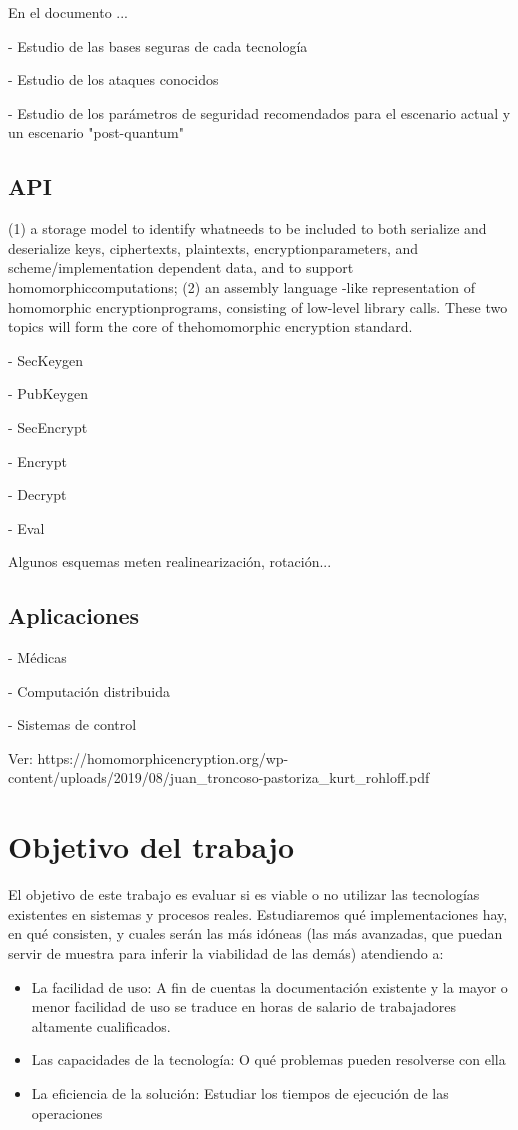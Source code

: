 En el documento \cite{chase_security_2017} ...

- Estudio de las bases seguras de cada tecnología

- Estudio de los ataques conocidos

- Estudio de los parámetros de seguridad recomendados para el escenario actual y un escenario "post-quantum" \cite{citar}

\subsection{API}

\cite{brenner_standard_2017}

(1) a ​storage model​ to identify whatneeds to be included to both serialize and deserialize keys, ciphertexts, plaintexts, encryptionparameters, and scheme/implementation dependent data, and to support homomorphiccomputations; (2) an ​assembly language​ -like representation of homomorphic encryptionprograms, consisting of low-level library calls. These two topics will form the core of thehomomorphic encryption standard.

- SecKeygen

- PubKeygen

- SecEncrypt

- Encrypt

- Decrypt

- Eval


Algunos esquemas meten realinearización, rotación...

\subsection{Aplicaciones}

\cite{archer_applications_2017}

- Médicas

- Computación distribuida

- Sistemas de control

Ver: https://homomorphicencryption.org/wp-content/uploads/2019/08/juan_troncoso-pastoriza_kurt_rohloff.pdf

\section{Objetivo del trabajo}

El objetivo de este trabajo es evaluar si es viable o no utilizar las tecnologías existentes en sistemas y procesos reales. Estudiaremos qué implementaciones hay, en qué consisten, y cuales serán las más idóneas (las más avanzadas, que puedan servir de muestra para inferir la viabilidad de las demás) atendiendo a:

\begin{itemize}
    \item La facilidad de uso: A fin de cuentas la documentación existente y la mayor o menor facilidad de uso se traduce en horas de salario de trabajadores altamente cualificados.
    \item Las capacidades de la tecnología: O qué problemas pueden resolverse con ella
    \item La eficiencia de la solución: Estudiar los tiempos de ejecución de las operaciones
\end{itemize}